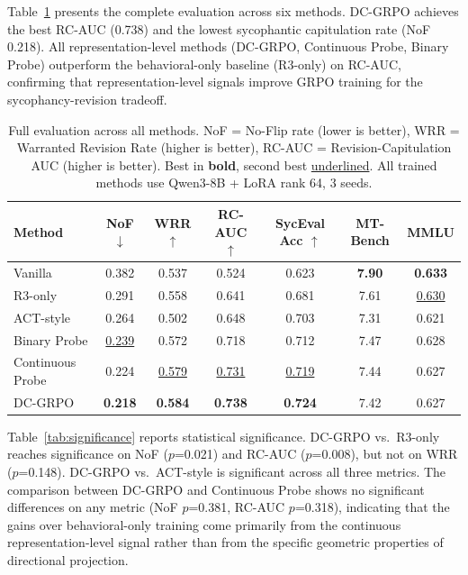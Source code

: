 \documentclass[11pt,a4paper]{article}
\begin{document}
Table~\ref{tab:main} presents the complete evaluation across six methods. DC-GRPO achieves the best RC-AUC (0.738) and the lowest sycophantic capitulation rate (NoF 0.218). All representation-level methods (DC-GRPO, Continuous Probe, Binary Probe) outperform the behavioral-only baseline (R3-only) on RC-AUC, confirming that representation-level signals improve GRPO training for the sycophancy-revision tradeoff.

\begin{table}[t]
\centering
\caption{Full evaluation across all methods. NoF = No-Flip rate (lower is better), WRR = Warranted Revision Rate (higher is better), RC-AUC = Revision-Capitulation AUC (higher is better). Best in \textbf{bold}, second best \underline{underlined}. All trained methods use Qwen3-8B + LoRA rank 64, 3 seeds.}
\label{tab:main}
\small
\begin{tabular}{lcccccc}
\toprule
Method & NoF $\downarrow$ & WRR $\uparrow$ & RC-AUC $\uparrow$ & SycEval Acc $\uparrow$ & MT-Bench & MMLU \\
\midrule
Vanilla          & 0.382 & 0.537 & 0.524 & 0.623 & \textbf{7.90} & \textbf{0.633} \\
R3-only          & 0.291 & 0.558 & 0.641 & 0.681 & 7.61 & \underline{0.630} \\
ACT-style        & 0.264 & 0.502 & 0.648 & 0.703 & 7.31 & 0.621 \\
Binary Probe     & \underline{0.239} & 0.572 & 0.718 & 0.712 & 7.47 & 0.628 \\
Continuous Probe & 0.224 & \underline{0.579} & \underline{0.731} & \underline{0.719} & 7.44 & 0.627 \\
DC-GRPO          & \textbf{0.218} & \textbf{0.584} & \textbf{0.738} & \textbf{0.724} & 7.42 & 0.627 \\
\bottomrule
\end{tabular}
\end{table}

Table~\ref{tab:significance} reports statistical significance. DC-GRPO vs.\ R3-only reaches significance on NoF ($p$=0.021) and RC-AUC ($p$=0.008), but not on WRR ($p$=0.148). DC-GRPO vs.\ ACT-style is significant across all three metrics. The comparison between DC-GRPO and Continuous Probe shows no significant differences on any metric (NoF $p$=0.381, RC-AUC $p$=0.318), indicating that the gains over behavioral-only training come primarily from the continuous representation-level signal rather than from the specific geometric properties of directional projection.
\end{document}
